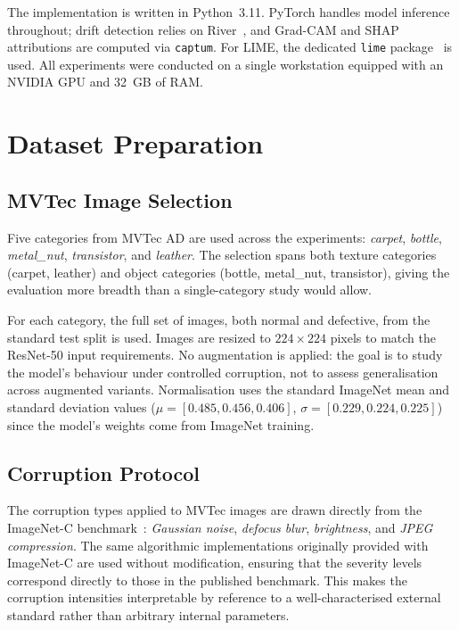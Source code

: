 The implementation is written in Python~3.11. PyTorch handles model inference throughout; drift detection relies on River~\autocite{Montiel2021}, and Grad-CAM and SHAP attributions are computed via \texttt{captum}. For LIME, the dedicated \texttt{lime} package~\autocite{Ribeiro2016} is used. All experiments were conducted on a single workstation equipped with an NVIDIA GPU and 32~GB of RAM.

\section{Dataset Preparation}
\label{sec:dataset-prep}

\subsection{MVTec Image Selection}

Five categories from MVTec AD are used across the experiments: \textit{carpet}, \textit{bottle}, \textit{metal\_nut}, \textit{transistor}, and \textit{leather}. The selection spans both texture categories (carpet, leather) and object categories (bottle, metal\_nut, transistor), giving the evaluation more breadth than a single-category study would allow.

For each category, the full set of images, both normal and defective, from the standard test split is used. Images are resized to $224 \times 224$ pixels to match the ResNet-50 input requirements. No augmentation is applied: the goal is to study the model's behaviour under controlled corruption, not to assess generalisation across augmented variants. Normalisation uses the standard ImageNet mean and standard deviation values ($\mu = [0.485, 0.456, 0.406]$, $\sigma = [0.229, 0.224, 0.225]$) since the model's weights come from ImageNet training.

\subsection{Corruption Protocol}

The corruption types applied to MVTec images are drawn directly from the ImageNet-C benchmark~\autocite{Hendrycks2019}: \textit{Gaussian noise}, \textit{defocus blur}, \textit{brightness}, and \textit{JPEG compression}. The same algorithmic implementations originally provided with ImageNet-C are used without modification, ensuring that the severity levels correspond directly to those in the published benchmark. This makes the corruption intensities interpretable by reference to a well-characterised external standard rather than arbitrary internal parameters.

